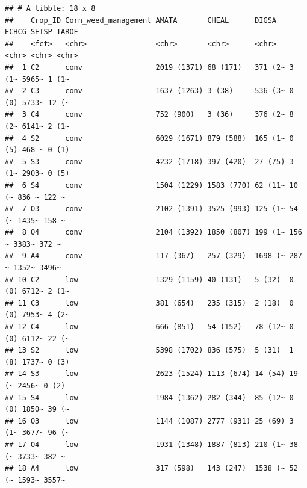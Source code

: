 \documentclass[
]{article}
\begin{document}
\begin{verbatim}
## # A tibble: 18 x 8
##    Crop_ID Corn_weed_management AMATA       CHEAL      DIGSA   ECHCG SETSP TAROF
##    <fct>   <chr>                <chr>       <chr>      <chr>   <chr> <chr> <chr>
##  1 C2      conv                 2019 (1371) 68 (171)   371 (2~ 3 (1~ 5965~ 1 (1~
##  2 C3      conv                 1637 (1263) 3 (38)     536 (3~ 0 (0) 5733~ 12 (~
##  3 C4      conv                 752 (900)   3 (36)     376 (2~ 8 (2~ 6141~ 2 (1~
##  4 S2      conv                 6029 (1671) 879 (588)  165 (1~ 0 (5) 468 ~ 0 (1)
##  5 S3      conv                 4232 (1718) 397 (420)  27 (75) 3 (1~ 2903~ 0 (5)
##  6 S4      conv                 1504 (1229) 1583 (770) 62 (11~ 10 (~ 836 ~ 122 ~
##  7 O3      conv                 2102 (1391) 3525 (993) 125 (1~ 54 (~ 1435~ 158 ~
##  8 O4      conv                 2104 (1392) 1850 (807) 199 (1~ 156 ~ 3383~ 372 ~
##  9 A4      conv                 117 (367)   257 (329)  1698 (~ 287 ~ 1352~ 3496~
## 10 C2      low                  1329 (1159) 40 (131)   5 (32)  0 (0) 6712~ 2 (1~
## 11 C3      low                  381 (654)   235 (315)  2 (18)  0 (0) 7953~ 4 (2~
## 12 C4      low                  666 (851)   54 (152)   78 (12~ 0 (0) 6112~ 22 (~
## 13 S2      low                  5398 (1702) 836 (575)  5 (31)  1 (8) 1737~ 0 (3)
## 14 S3      low                  2623 (1524) 1113 (674) 14 (54) 19 (~ 2456~ 0 (2)
## 15 S4      low                  1984 (1362) 282 (344)  85 (12~ 0 (0) 1850~ 39 (~
## 16 O3      low                  1144 (1087) 2777 (931) 25 (69) 3 (1~ 3677~ 96 (~
## 17 O4      low                  1931 (1348) 1887 (813) 210 (1~ 38 (~ 3733~ 382 ~
## 18 A4      low                  317 (598)   143 (247)  1538 (~ 52 (~ 1593~ 3557~
\end{verbatim}
\end{document}
